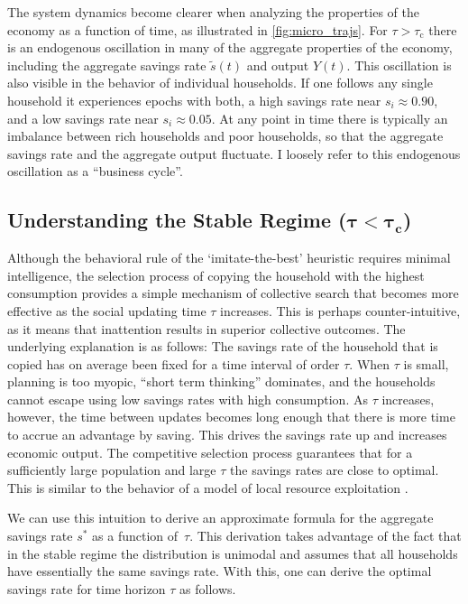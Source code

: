 The system dynamics become clearer when analyzing the properties of the 
economy as a function of time, as illustrated in \cref{fig:micro_trajs}.  
For $\tau \! > \! \tau_\mathrm{c}$ there is an endogenous oscillation in many of the aggregate properties of the economy, including the aggregate savings rate $\tilde{s}(t)$ and output $Y(t)$.  This oscillation is also visible in the behavior of individual households.  If one follows any single household it experiences epochs with both, a high savings rate near $s_i \! \approx \! 0.90$, and a low savings rate near $s_i \! \approx \! 0.05$.  At any point in time there is typically an imbalance between rich households and poor households, so that the aggregate savings rate and the aggregate output fluctuate.  I loosely refer to this endogenous oscillation as a ``business cycle''.


\subsection{Understanding the Stable Regime ($\mathbf{\tau \! < \! \tau_{c} }$)}
\label{sec:savings_stable}
Although the behavioral rule of the `imitate-the-best' heuristic requires minimal intelligence, the selection process of copying the household with the highest consumption provides a simple mechanism of collective search that becomes more effective as the social updating time $\tau$ increases.  This is perhaps counter-intuitive, as it means that inattention results in superior collective outcomes. The underlying explanation is as follows:  The  savings rate of the household that is copied has on average been fixed for a time interval of order $\tau$. When $\tau$ is small, planning is too myopic, ``short term thinking'' dominates, and the households cannot escape using low savings rates with high consumption.  As $\tau$ increases, however, the time between updates becomes long enough that there is more time to accrue an advantage by saving. This drives the savings rate up and increases economic output. The competitive selection process guarantees that for a sufficiently large population and large $\tau$ the savings rates are close to optimal. This is similar to the behavior of a model of local resource exploitation \citep{Wiedermann2015}.

We can use this intuition to derive an approximate formula for the aggregate savings rate $s^*$ as a function of~$\tau$. This derivation takes advantage of the fact that in the stable regime the distribution is unimodal and assumes that all households have essentially the same savings rate. With this, one can derive the optimal savings rate for time horizon $\tau$ as follows.\\ 

